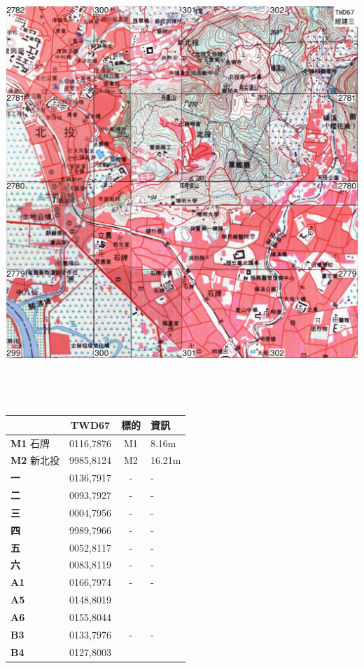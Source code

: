 \documentclass{article}
\begin{document}
\begin{CJK*}{UTF8}{bkai}
\begin{multicols}{2}
\includegraphics[width=20.73cm, height=16.58cm]{v3.png}
\begin{tabular}{|l|c|c|l|}
	\hline
	&TWD67&標的&資訊\\  
	\hline
	\textbf{M1} 石牌&0116,7876&M1&8.16m\\
	\textbf{M2} 新北投&9985,8124&M2&16.21m\\
	\hline
	\textbf{一}&0136,7917&-&-\\
	\textbf{二}&0093,7927&-&-\\
	\textbf{三}&0004,7956&-&-\\
	\textbf{四}&9989,7966&-&-\\
	\textbf{五}&0052,8117&-&-\\
	\textbf{六}&0083,8119&-&-\\
	\hline
	\textbf{A1}&0166,7974&-&-\\
	\textbf{A5}&0148,8019& &\\
	\textbf{A6}&0155,8044& & \\
	\hline
	\textbf{B3}&0133,7976&-&-\\
	\textbf{B4}&0127,8003& &\\

\end{tabular}
\end{multicols}
\end{CJK*}
\end{document}
